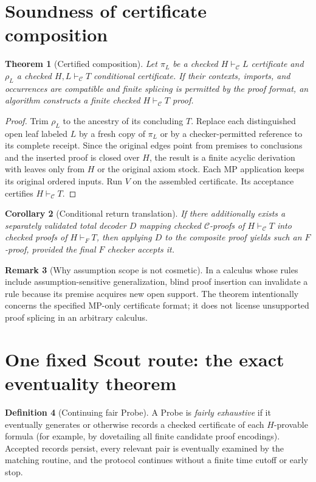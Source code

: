 \documentclass[11pt,letterpaper]{article}
\newtheorem{theorem}{Theorem}[section]
\newtheorem{corollary}[theorem]{Corollary}
\theoremstyle{definition}
\newtheorem{definition}[theorem]{Definition}
\newtheorem{remark}[theorem]{Remark}
\newcommand{\C}{\mathcal C}
\newcommand{\vdC}{\vdash_{\mathcal C}}
\begin{document}
\section{Soundness of certificate composition}
\begin{theorem}[Certified composition]\label{th:compose}
Let $\pi_L$ be a checked $H\vdC L$ certificate and $\rho_L$ a checked
$H,L\vdC T$ conditional certificate. If their contexts, imports, and
occurrences are compatible and finite splicing is permitted by the proof
format, an algorithm constructs a finite checked $H\vdC T$ proof.
\end{theorem}
\begin{proof}
Trim $\rho_L$ to the ancestry of its concluding $T$. Replace each distinguished
open leaf labeled $L$ by a fresh copy of $\pi_L$ or by a checker-permitted
reference to its complete receipt. Since the original edges point from
premises to conclusions and the inserted proof is closed over $H$, the
result is a finite acyclic derivation with leaves only from $H$ or the
original axiom stock. Each MP application keeps its original ordered inputs.
Run $V$ on the assembled certificate. Its acceptance certifies $H\vdC T$.
\end{proof}

\begin{corollary}[Conditional return translation]
If there additionally exists a separately validated total decoder
$D$ mapping checked $\C$-proofs of $H\vdC T$ into checked proofs of
$H\vdash_F T$, then applying $D$ to the composite proof yields such an
$F$-proof, provided the final $F$ checker accepts it.
\end{corollary}

\begin{remark}[Why assumption scope is not cosmetic]
In a calculus whose rules include assumption-sensitive generalization,
blind proof insertion can invalidate a rule because its premise acquires
new open support. The theorem intentionally concerns the specified MP-only
certificate format; it does not license unsupported proof splicing in an
arbitrary calculus.
\end{remark}

\section{One fixed Scout route: the exact eventuality theorem}
\begin{definition}[Continuing fair Probe]
A Probe is \emph{fairly exhaustive} if it eventually generates or otherwise
records a checked certificate of each $H$-provable formula (for example,
by dovetailing all finite candidate proof encodings). Accepted records
persist, every relevant pair is eventually examined by the matching routine,
and the protocol continues without a finite time cutoff or early stop.
\end{definition}
\end{document}
